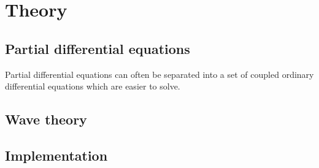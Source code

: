 \section{Theory}
\label{sec:theory}

\subsection{Partial differential equations}
\label{sec:pde}
Partial differential equations can often be separated into a set of coupled ordinary differential equations which are easier to solve.


\subsection{Wave theory}
\label{sec:wave}

\subsection{Implementation}
\label{sec:implement}
